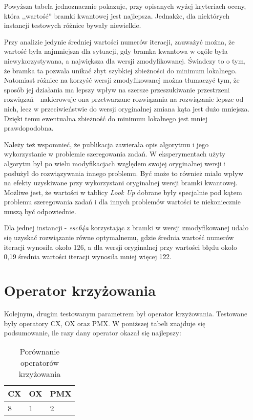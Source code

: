 Powyższa tabela jednoznacznie pokazuje, przy opisanych wyżej kryteriach oceny, która ,,wartość'' bramki kwantowej jest najlepsza. Jednakże, dla niektórych instancji testowych różnice bywały niewielkie. 

Przy analizie jedynie średniej wartości numerów iteracji, zauważyć można, że wartość była najmniejsza dla sytuacji, gdy bramka kwantowa w ogóle była niewykorzystywana, a największa dla wersji zmodyfikowanej. Świadczy to o tym, że bramka ta pozwala unikać zbyt szybkiej zbieżności do minimum lokalnego. Natomiast różnice na korzyść wersji zmodyfikowanej można tłumaczyć tym, że sposób jej działania ma lepszy wpływ na szersze przeszukiwanie przestrzeni rozwiązań - nakierowuje ona przetwarzane rozwiązania na rozwiązanie lepsze od nich, lecz w przeciwieństwie do wersji oryginalnej zmiana kąta jest dużo mniejsza. Dzięki temu ewentualna zbieżność do minimum lokalnego jest mniej prawdopodobna.

Należy też wspomnieć, że publikacja \cite{NPQGA} zawierała opis algorytmu i jego wykorzystanie w problemie szeregowania zadań. W eksperymentach użyty algorytm był po wielu modyfikacjach względem swojej oryginalnej wersji i posłużył do rozwiązywania innego problemu. Być może to również miało wpływ na efekty uzyskiwane przy wykorzystani oryginalnej wersji bramki kwantowej. Możliwe jest, że wartości w tablicy \textit{Look Up} dobrane były specjalnie pod kątem problemu szeregowania zadań i dla innych problemów wartości te niekoniecznie muszą być odpowiednie.

Dla jednej instancji - \textit{esc64a} korzystając z bramki w wersji zmodyfikowanej udało się uzyskać rozwiązanie równe optymalnemu, gdzie średnia wartość numerów iteracji wynosiła około 126, a dla wersji oryginalnej przy wartości błędu około 0,19 średnia wartości iteracji wynosiła mniej więcej 122.

\section{Operator krzyżowania}
Kolejnym, drugim testowanym parametrem był operator krzyżowania. Testowane były operatory CX, OX oraz PMX. W poniższej tabeli znajduje się podsumowanie, ile razy dany operator okazał się najlepszy:

\begin{table}[H]
\label{cross_oper_results}
\begin{center}
\begin{tabular}{l l l}
\hline
CX & OX & PMX \\
\hline
8 & 1 & 2\\
\hline
\end{tabular}
\end{center}
\caption{Porównanie operatorów krzyżowania}
\end{table}

